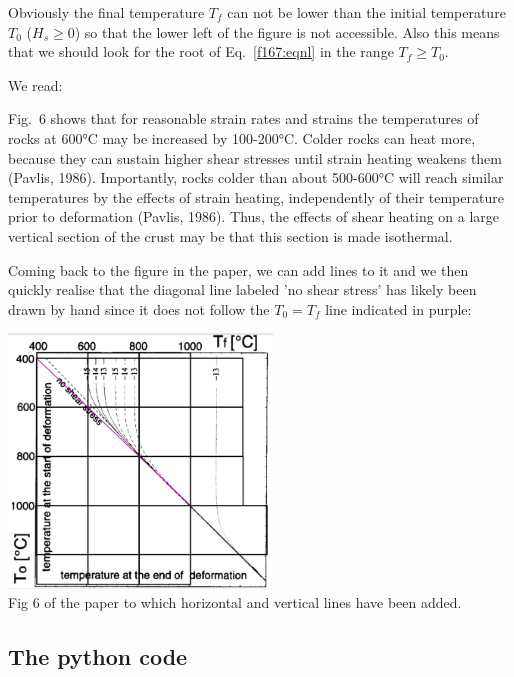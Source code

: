 Obviously the final temperature $T_f$ can not be lower than the initial temperature $T_0$
($H_s\ge 0$) so that the lower left of the figure is not accessible. Also this means that we should
look for the root of Eq.~\eqref{f167:eqnl} in the range $T_f\ge T_0$.

We read:
\begin{displayquote}
{\color{darkgray}
Fig.~6 shows that for reasonable strain rates and strains the temperatures of rocks at 600\si{\celsius} 
may be increased by 100-200\si{\celsius}. 
Colder rocks can heat more, because they can sustain higher shear stresses until
strain heating weakens them (Pavlis, 1986). Importantly, rocks colder than about 500-600\si{\celsius} 
will reach similar temperatures by the effects of strain heating, independently
of their temperature prior to deformation (Pavlis, 1986). Thus, the effects of shear heating
on a large vertical section of the crust may be that
this section is made isothermal.}
\end{displayquote}

Coming back to the figure in the paper, we can add lines to it and 
we then quickly realise that the diagonal line labeled 'no shear stress'
has likely been drawn by hand since it does not follow the $T_0=T_f$ line
indicated in purple:

\begin{center}
\includegraphics[width=7cm]{python_codes/fieldstone_167/drawing.jpg} \\
{\captionfont Fig 6 of the paper to which horizontal and vertical lines 
have been added.}
\end{center}

\subsection*{The python code}

